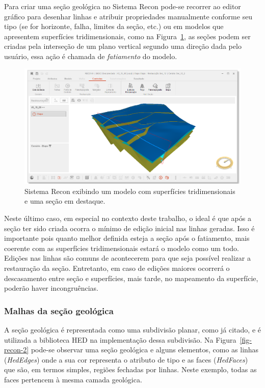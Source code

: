 Para criar uma seção geológica no Sistema Recon pode-se recorrer ao editor gráfico para desenhar linhas e atribuir propriedades manualmente conforme seu tipo (se for horizonte, falha, limites da seção, etc.) ou em modelos que apresentem superfícies tridimensionais, como na Figura~\ref{fig-recon-1}, as seções podem ser criadas pela interseção de um plano vertical segundo uma direção dada pelo usuário, essa ação é chamada de \textit{fatiamento} do modelo.

\begin{figure} [H]
  \begin{center}
    \includegraphics[width=\textwidth]{images/fig-recon-1}
    \caption{Sistema Recon exibindo um modelo com superfícies tridimensionais e uma seção em destaque.}\label{fig-recon-1}
  \end{center}
\end{figure}

Neste último caso, em especial no contexto deste trabalho, o ideal é que após a seção ter sido criada ocorra o mínimo de edição inicial nas linhas geradas. Isso é importante pois quanto melhor definida esteja a seção após o fatiamento, mais coerente com as superfícies tridimensionais estará o modelo como um todo. Edições nas linhas são comuns de acontecerem para que seja possível realizar a restauração da seção. Entretanto, em caso de edições maiores ocorrerá o descasamento entre seção e superfícies, mais tarde, no mapeamento da superfície, poderão haver incongruências.

\subsubsection{Malhas da seção geológica}

A seção geológica é representada como uma subdivisão planar, como já citado, e é utilizada a biblioteca HED na implementação dessa subdivisão. Na Figura~\ref{fig-recon-2} pode-se observar uma seção geológica e alguns elementos, como as linhas (\textit{HedEdges}) onde a sua cor representa o atributo de tipo e as faces (\textit{HedFaces}) que são, em termos simples, regiões fechadas por linhas. Neste exemplo, todas as faces pertencem à mesma camada geológica.

